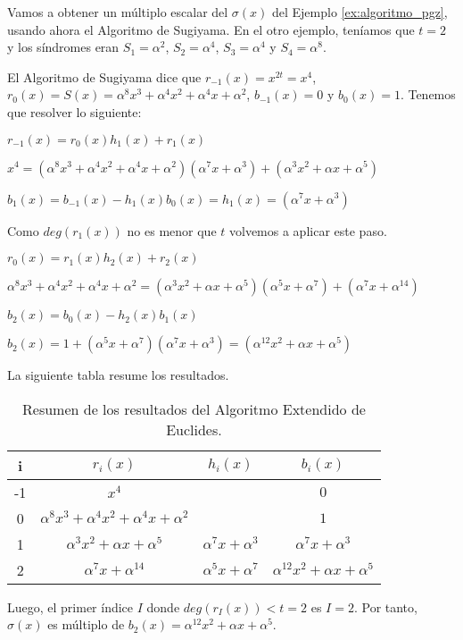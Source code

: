 \begin{exampleth}
\label{ex:algoritmo_sugiyama}

Vamos a obtener un múltiplo escalar del $\sigma(x)$ del Ejemplo \ref{ex:algoritmo_pgz}, usando ahora el Algoritmo de Sugiyama. En el otro ejemplo, teníamos que $t=2$ y los síndromes eran $S_1 = \alpha^2$, $S_2 = \alpha^4$, $S_3 = \alpha^4$ y $S_4 = \alpha^8$.

El Algoritmo de Sugiyama dice que $r_{-1}(x) = x^{2t} = x^4$, $r_0(x) = S(x) = \alpha^8 x^3 + \alpha^4 x^2 + \alpha^4 x + \alpha^2$, $b_{-1}(x)= 0$ y $b_0(x) = 1$. Tenemos que resolver lo siguiente:

$ r_{-1}(x) = r_0(x)h_1(x) + r_1(x)$

$x^4 = (\alpha^8 x^3 + \alpha^4 x^2 + \alpha^4 x + \alpha^2)(\alpha^7 x + \alpha^3) + (\alpha^3 x^2 + \alpha x + \alpha^5)$

$b_1(x) = b_{-1}(x) - h_1(x)b_0(x) = h_1(x) = (\alpha^7 x + \alpha^3)$

Como $deg(r_1(x))$ no es menor que $t$ volvemos a aplicar este paso.

$r_0(x) = r_1(x)h_2(x) + r_2(x)$

$\alpha^8 x^3 + \alpha^4 x^2 + \alpha^4 x + \alpha^2 = (\alpha^3 x^2 + \alpha x + \alpha^5)(\alpha^5 x + \alpha^7) + (\alpha^7 x + \alpha^{14})$

$b_2(x) = b_0(x) - h_2(x)b_1(x)$

$b_2(x) = 1 + (\alpha^5 x + \alpha^7)(\alpha^7 x + \alpha^3) = (\alpha^{12}x^2 + \alpha x + \alpha^5)$


 La siguiente tabla resume los resultados.
 \begin{table}[h]
\begin{tabular}{ c | c | c | c |}
	i & $r_i(x)$ & $h_i(x)$ & $b_i(x)$\\ \hline
	-1 & $x^4$  &  & $0$ \\
	0 & $\alpha^8x^3 + \alpha^{4}x^2+\alpha^4x + \alpha^2$ &  & $1$ \\ 
	1 & $\alpha^3 x^2 + \alpha x + \alpha^{5}$ & $\alpha^7 x + \alpha^{3}$ & $\alpha^7 x + \alpha^{3}$ \\
	2 & $\alpha^7 x + \alpha^{14}$  &  $\alpha^5 x + \alpha^7$ & $\alpha^{12}x^2 + \alpha x + \alpha^5$ 
	\end{tabular}
 \caption{Resumen de los resultados del Algoritmo Extendido de Euclides.}
 \end{table}

Luego, el primer índice $I$ donde $deg(r_I(x)) < t = 2$ es $I = 2$. Por tanto, $\sigma(x)$ es múltiplo de $b_2(x) = \alpha^{12}x^2 + \alpha x + \alpha^5 $.
\end{exampleth}

